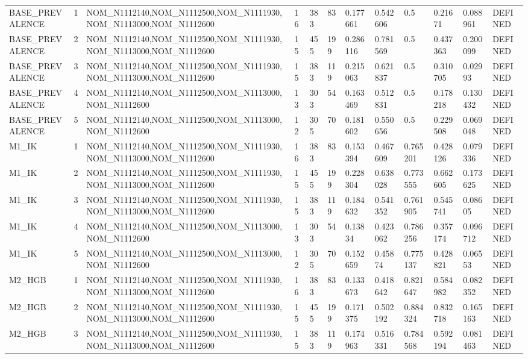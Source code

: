 \begin{table}[ht]
\begin{tabular}{llllllllllll}
BASE\_PREVALENCE & 1 & NOM\_N1112140,NOM\_N1112500,NOM\_N1111930,NOM\_N1113000,NOM\_N1112600 & 16 & 383 & 83 & 0.177661 & 0.542606 & 0.5 & 0.21671 & 0.088961 & DEFINED \\
BASE\_PREVALENCE & 2 & NOM\_N1112140,NOM\_N1112500,NOM\_N1111930,NOM\_N1113000,NOM\_N1112600 & 15 & 455 & 199 & 0.286116 & 0.781569 & 0.5 & 0.437363 & 0.200099 & DEFINED \\
BASE\_PREVALENCE & 3 & NOM\_N1112140,NOM\_N1112500,NOM\_N1111930,NOM\_N1113000,NOM\_N1112600 & 15 & 383 & 119 & 0.215063 & 0.621837 & 0.5 & 0.310705 & 0.02993 & DEFINED \\
BASE\_PREVALENCE & 4 & NOM\_N1112140,NOM\_N1112500,NOM\_N1113000,NOM\_N1112600 & 13 & 303 & 54 & 0.163469 & 0.512831 & 0.5 & 0.178218 & 0.130432 & DEFINED \\
BASE\_PREVALENCE & 5 & NOM\_N1112140,NOM\_N1112500,NOM\_N1113000,NOM\_N1112600 & 12 & 305 & 70 & 0.181602 & 0.550656 & 0.5 & 0.229508 & 0.069048 & DEFINED \\
M1\_IK & 1 & NOM\_N1112140,NOM\_N1112500,NOM\_N1111930,NOM\_N1113000,NOM\_N1112600 & 16 & 383 & 83 & 0.153394 & 0.467609 & 0.765201 & 0.428126 & 0.079336 & DEFINED \\
M1\_IK & 2 & NOM\_N1112140,NOM\_N1112500,NOM\_N1111930,NOM\_N1113000,NOM\_N1112600 & 15 & 455 & 199 & 0.228304 & 0.638028 & 0.773555 & 0.662605 & 0.173625 & DEFINED \\
M1\_IK & 3 & NOM\_N1112140,NOM\_N1112500,NOM\_N1111930,NOM\_N1113000,NOM\_N1112600 & 15 & 383 & 119 & 0.184632 & 0.541352 & 0.761905 & 0.545741 & 0.08605 & DEFINED \\
M1\_IK & 4 & NOM\_N1112140,NOM\_N1112500,NOM\_N1113000,NOM\_N1112600 & 13 & 303 & 54 & 0.13834 & 0.423062 & 0.786256 & 0.357174 & 0.096712 & DEFINED \\
M1\_IK & 5 & NOM\_N1112140,NOM\_N1112500,NOM\_N1113000,NOM\_N1112600 & 12 & 305 & 70 & 0.152659 & 0.45874 & 0.775137 & 0.428821 & 0.06553 & DEFINED \\
M2\_HGB & 1 & NOM\_N1112140,NOM\_N1112500,NOM\_N1111930,NOM\_N1113000,NOM\_N1112600 & 16 & 383 & 83 & 0.133673 & 0.418642 & 0.821647 & 0.584982 & 0.082352 & DEFINED \\
M2\_HGB & 2 & NOM\_N1112140,NOM\_N1112500,NOM\_N1111930,NOM\_N1113000,NOM\_N1112600 & 15 & 455 & 199 & 0.171375 & 0.502192 & 0.884324 & 0.832718 & 0.165163 & DEFINED \\
M2\_HGB & 3 & NOM\_N1112140,NOM\_N1112500,NOM\_N1111930,NOM\_N1113000,NOM\_N1112600 & 15 & 383 & 119 & 0.174963 & 0.516331 & 0.784568 & 0.592194 & 0.081463 & DEFINED \\

\end{tabular}
\end{table}
